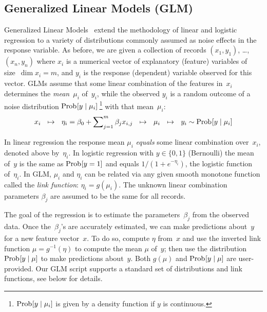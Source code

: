 \subsection{Generalized Linear Models (GLM)}
\label{sec:GLM}

\smallskip

Generalized Linear Models~\cite{Gill2000:GLM,McCullagh1989:GLM,Nelder1972:GLM}
extend the methodology of linear and logistic regression to a variety of
distributions commonly assumed as noise effects in the response variable.
As before, we are given a collection
of records $(x_1, y_1)$, \ldots, $(x_n, y_n)$ where $x_i$ is a numerical vector of
explanatory (feature) variables of size~\mbox{$\dim x_i = m$}, and $y_i$ is the
response (dependent) variable observed for this vector.  GLMs assume that some
linear combination of the features in~$x_i$ determines the \emph{mean}~$\mu_i$
of~$y_i$, while the observed $y_i$ is a random outcome of a noise distribution
$\mathop{\mathrm{Prob}\hspace{0.5pt}}\nolimits[y\mid \mu_i]\,$\footnote{$\mathop{\mathrm{Prob}\hspace{0.5pt}}\nolimits[y\mid \mu_i]$ is given by a density function
if $y$ is continuous.}
with that mean~$\mu_i$:
\begin{equation*}
x_i \,\,\,\,\mapsto\,\,\,\, \eta_i = \beta_0 + \sum\nolimits_{j=1}^m \beta_j x_{i,j} 
\,\,\,\,\mapsto\,\,\,\, \mu_i \,\,\,\,\mapsto \,\,\,\, y_i \sim \mathop{\mathrm{Prob}\hspace{0.5pt}}\nolimits[y\mid \mu_i]
\end{equation*}

In linear regression the response mean $\mu_i$ \emph{equals} some linear combination
over~$x_i$, denoted above by~$\eta_i$.
In logistic regression with $y\in\{0, 1\}$ (Bernoulli) the mean of~$y$ is the same
as $\mathop{\mathrm{Prob}\hspace{0.5pt}}\nolimits[y=1]$ and equals $1/(1+e^{-\eta_i})$, the logistic function of~$\eta_i$.
In GLM, $\mu_i$ and $\eta_i$ can be related via any given smooth monotone function
called the \emph{link function}: $\eta_i = g(\mu_i)$.  The unknown linear combination
parameters $\beta_j$ are assumed to be the same for all records.

The goal of the regression is to estimate the parameters~$\beta_j$ from the observed
data.  Once the~$\beta_j$'s are accurately estimated, we can make predictions
about~$y$ for a new feature vector~$x$.  To do so, compute $\eta$ from~$x$ and use
the inverted link function $\mu = g^{-1}(\eta)$ to compute the mean $\mu$ of~$y$;
then use the distribution $\mathop{\mathrm{Prob}\hspace{0.5pt}}\nolimits[y\mid \mu]$ to make predictions about~$y$.
Both $g(\mu)$ and $\mathop{\mathrm{Prob}\hspace{0.5pt}}\nolimits[y\mid \mu]$ are user-provided.  Our GLM script supports
a standard set of distributions and link functions, see below for details.

